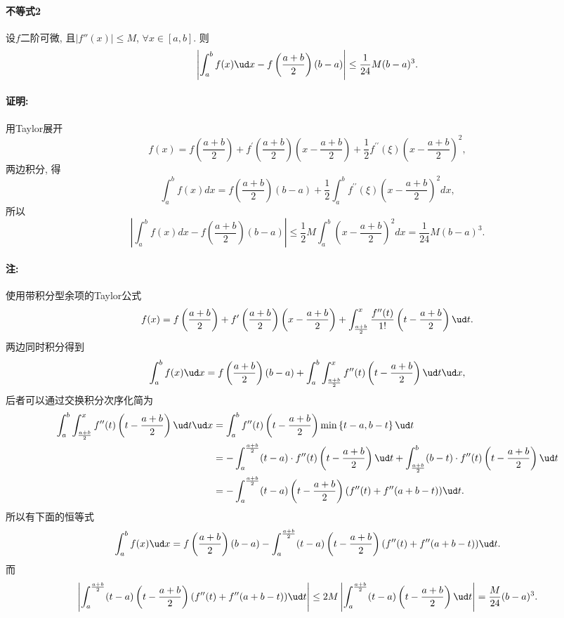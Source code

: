 \paragraph{不等式2}

设$f$二阶可微, 且$\left|f''(x)\right|\le M$, $\forall x\in[a,b]$. 则
\[
\left|\int_{a}^{b}f(x)\ud x-f\left(\frac{a+b}{2}\right)(b-a)\right|\le\frac{1}{24}M(b-a)^{3}.
\]


\paragraph{证明:}

用Taylor展开
\[
f(x)=f\left(\frac{a+b}{2}\right)+f^{\prime}\left(\frac{a+b}{2}\right)\left(x-\frac{a+b}{2}\right)+\frac{1}{2}f^{\prime\prime}(\xi)\left(x-\frac{a+b}{2}\right)^{2},
\]
两边积分, 得
\[
\int_{a}^{b}f(x)dx=f\left(\frac{a+b}{2}\right)(b-a)+\frac{1}{2}\int_{a}^{b}f^{\prime\prime}(\xi)\left(x-\frac{a+b}{2}\right)^{2}dx,
\]
所以
\[
\left|\int_{a}^{b}f(x)dx-f\left(\frac{a+b}{2}\right)(b-a)\right|\leqslant\frac{1}{2}M\int_{a}^{b}\left(x-\frac{a+b}{2}\right)^{2}dx=\frac{1}{24}M(b-a)^{3}.
\]


\paragraph{注:}

使用带积分型余项的Taylor公式
\[
f(x)=f\left(\frac{a+b}{2}\right)+f'\left(\frac{a+b}{2}\right)\left(x-\frac{a+b}{2}\right)+\int_{\frac{a+b}{2}}^{x}\frac{f''(t)}{1!}\left(t-\frac{a+b}{2}\right)\ud t.
\]
两边同时积分得到
\[
\int_{a}^{b}f(x)\ud x=f\left(\frac{a+b}{2}\right)(b-a)+\int_{a}^{b}\int_{\frac{a+b}{2}}^{x}f''(t)\left(t-\frac{a+b}{2}\right)\ud t\ud x,
\]
后者可以通过交换积分次序化简为
\begin{align*}
\int_{a}^{b}\int_{\frac{a+b}{2}}^{x}f''(t)\left(t-\frac{a+b}{2}\right)\ud t\ud x & =\int_{a}^{b}f''(t)\left(t-\frac{a+b}{2}\right)\min\left\{ t-a,b-t\right\} \ud t\\
 & =-\int_{a}^{\frac{a+b}{2}}(t-a)\cdot f''(t)\left(t-\frac{a+b}{2}\right)\ud t+\int_{\frac{a+b}{2}}^{b}(b-t)\cdot f''(t)\left(t-\frac{a+b}{2}\right)\ud t\\
 & =-\int_{a}^{\frac{a+b}{2}}(t-a)\left(t-\frac{a+b}{2}\right)(f''(t)+f''(a+b-t))\ud t.
\end{align*}
所以有下面的恒等式
\[
\int_{a}^{b}f(x)\ud x=f\left(\frac{a+b}{2}\right)(b-a)-\int_{a}^{\frac{a+b}{2}}(t-a)\left(t-\frac{a+b}{2}\right)(f''(t)+f''(a+b-t))\ud t.
\]
而
\[
\left|\int_{a}^{\frac{a+b}{2}}(t-a)\left(t-\frac{a+b}{2}\right)(f''(t)+f''(a+b-t))\ud t\right|\le2M\left|\int_{a}^{\frac{a+b}{2}}(t-a)\left(t-\frac{a+b}{2}\right)\ud t\right|=\frac{M}{24}(b-a)^{3}.
\]


